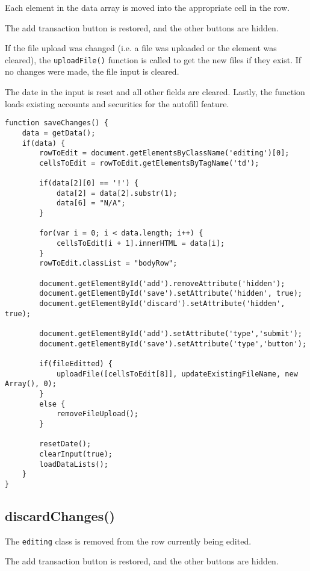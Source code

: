 \documentclass[letterpaper]{article}
\begin{document}
Each element in the data array is moved into the appropriate cell in the row.

The add transaction button is restored, and the other buttons are hidden.

If the file upload was changed (i.e. a file was uploaded or the element was cleared), the \lstinline{uploadFile()} function is called to get the new files if they exist.
If no changes were made, the file input is cleared.

The date in the input is reset and all other fields are cleared.
Lastly, the function loads existing accounts and securities for the autofill feature.

\begin{lstlisting}[firstnumber=301]
function saveChanges() {
    data = getData();
    if(data) {
        rowToEdit = document.getElementsByClassName('editing')[0];
        cellsToEdit = rowToEdit.getElementsByTagName('td');

        if(data[2][0] == '!') {
            data[2] = data[2].substr(1);
            data[6] = "N/A";
        }

        for(var i = 0; i < data.length; i++) {
            cellsToEdit[i + 1].innerHTML = data[i];
        }
        rowToEdit.classList = "bodyRow";

        document.getElementById('add').removeAttribute('hidden');
        document.getElementById('save').setAttribute('hidden', true);
        document.getElementById('discard').setAttribute('hidden', true);

        document.getElementById('add').setAttribute('type','submit');
        document.getElementById('save').setAttribute('type','button');

        if(fileEditted) {
            uploadFile([cellsToEdit[8]], updateExistingFileName, new Array(), 0);
        }
        else {
            removeFileUpload();
        }

        resetDate();
        clearInput(true);
        loadDataLists();
    }
}
\end{lstlisting}

\subsection{discardChanges()}

The \lstinline{editing} class is removed from the row currently being edited.

The add transaction button is restored, and the other buttons are hidden.
\end{document}
